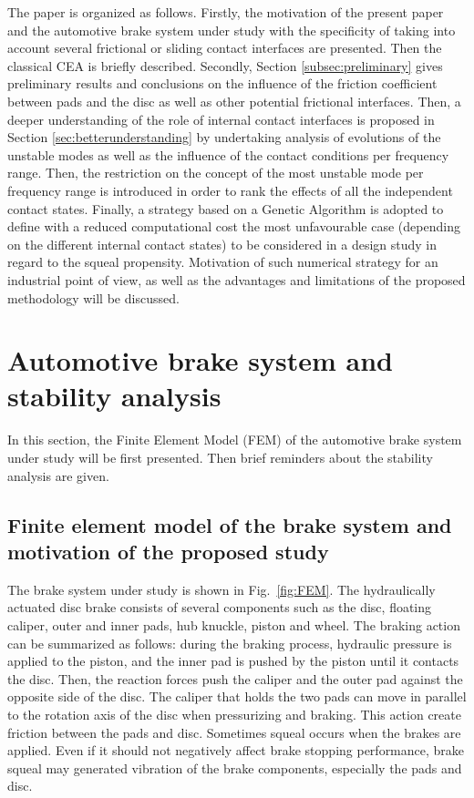 \documentclass[final,1p]{elsarticle}
\begin{document}
The paper is organized as follows. Firstly, the motivation of the present paper and the automotive brake system under study with the specificity of taking into account several frictional or sliding contact interfaces are presented. Then the classical CEA is briefly described. Secondly, Section \ref{subsec:preliminary} gives preliminary results and conclusions on the influence of the friction coefficient between pads and the disc as well as other potential frictional interfaces. Then, a deeper understanding of the role of internal contact interfaces is proposed in Section \ref{sec:betterunderstanding} by undertaking analysis of evolutions of the unstable modes as well as the influence of the contact conditions per frequency range. Then, the  restriction on the concept of the most unstable mode per frequency range is introduced in order to rank the effects of all the independent contact states. Finally, a strategy based on a Genetic Algorithm is adopted to define with a reduced computational cost  the most unfavourable case (depending on the different internal contact states) to be considered in a design study in regard to  the squeal propensity. Motivation of such numerical strategy for an industrial point of view, as well as the advantages and limitations of the proposed methodology will be discussed.



\section{Automotive brake system and stability analysis}
\label{subsec:FEMandCEA}
In this section, the Finite Element Model (FEM) of the automotive brake system under study will be first presented. Then brief reminders about the stability analysis are given.

\subsection{Finite element model of the brake system and motivation of the proposed study }

The brake system under study is shown in Fig.~\ref{fig:FEM}. The hydraulically actuated disc brake consists of several components such as the disc, floating caliper, outer and inner pads, hub knuckle, piston and wheel. The braking action can be summarized as follows: during the braking process, hydraulic pressure is applied to the piston, and the inner pad is pushed by the piston until it contacts the disc. Then, the reaction forces push the caliper and the outer pad against the opposite side of the disc. The caliper that holds the two pads can move in parallel to the rotation axis of the disc when pressurizing and braking. This action create friction between the pads and disc. Sometimes squeal occurs when the brakes are applied. Even if it should not negatively affect brake stopping performance, brake squeal may generated vibration of the brake components, especially the pads and disc. 
\end{document}

